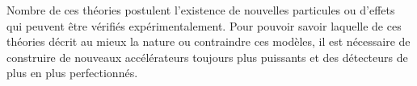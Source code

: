 Nombre de ces théories postulent l'existence de nouvelles particules ou d'effets qui peuvent être vérifiés expérimentalement. Pour pouvoir savoir laquelle de ces théories décrit au mieux la nature ou contraindre ces modèles, il est nécessaire de construire de nouveaux accélérateurs toujours plus puissants et des détecteurs de plus en plus perfectionnés. 
